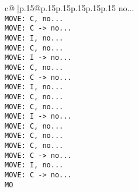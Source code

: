 \documentclass{article}
\begin{document}
{\begin{supertabular}{c@{$\;$}|p{.15\linewidth}@{}p{.15\linewidth}p{.15\linewidth}p{.15\linewidth}p{.15\linewidth}p{.15\linewidth}}
{{{no...\\ \tt  MOVE: C, no...\\ \tt  MOVE: C -> no...\\ \tt  MOVE: I, no...\\ \tt  MOVE: C, no...\\ \tt  MOVE: I -> no...\\ \tt  MOVE: C, no...\\ \tt  MOVE: C -> no...\\ \tt  MOVE: I, no...\\ \tt  MOVE: C, no...\\ \tt  MOVE: C, no...\\ \tt  MOVE: I -> no...\\ \tt  MOVE: C, no...\\ \tt  MOVE: C, no...\\ \tt  MOVE: C, no...\\ \tt  MOVE: C -> no...\\ \tt  MOVE: I, no...\\ \tt  MOVE: C -> no...\\ \tt  MO}}}
\end{supertabular}}
\end{document}
